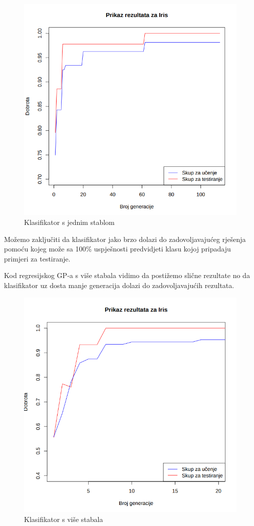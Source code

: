 \documentclass[times, utf8, zavrsni]{fer}
\begin{document}
\begin{figure}[htb]
\centering
\includegraphics[scale=0.45]{grafovi/iris1}
\caption{Klasifikator s jednim stablom}
\end{figure}

Možemo zaključiti da klasifikator jako brzo dolazi do zadovoljavajućeg rješenja pomoću kojeg može sa 100\% uspješnosti predvidjeti klasu kojoj pripadaju primjeri za testiranje.

Kod regresijskog GP-a s više stabala vidimo da postižemo slične rezultate no da klasifikator uz dosta manje generacija dolazi do zadovoljavajućih rezultata.
 
 
\begin{figure}[htb]
\centering
\includegraphics[scale=0.45]{grafovi/iris2}
\caption{Klasifikator s više stabala}
\end{figure}
\end{document}
